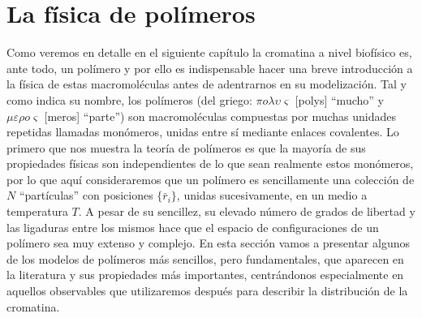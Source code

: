 \section{La física de polímeros}

Como veremos en detalle en el siguiente capítulo la cromatina a nivel biofísico es, ante todo, un polímero y por ello es indispensable hacer una breve introducción a la física de estas macromoléculas antes de adentrarnos en su modelización. Tal y como indica su nombre, los polímeros (del griego: $\pi o \lambda \upsilon \varsigma$ [polys] ``mucho'' y $\mu \varepsilon \rho o \varsigma$ [meros] ``parte'') son macromoléculas compuestas por muchas unidades repetidas llamadas monómeros, unidas entre sí mediante enlaces covalentes. Lo primero que nos muestra la teoría de polímeros es que la mayoría de sus propiedades físicas son independientes de lo que sean realmente estos monómeros, por lo que aquí consideraremos que un polímero es sencillamente una colección de $N$ ``partículas'' con posiciones $\{\bar{r}_i\}$, unidas sucesivamente, en un medio a temperatura $T$. A pesar de su sencillez, su elevado número de grados de libertad y las ligaduras entre los mismos hace que el espacio de configuraciones de un polímero sea muy extenso y complejo. En esta sección vamos a presentar algunos de los modelos de polímeros más sencillos, pero fundamentales, que aparecen en la literatura y sus propiedades más importantes, centrándonos especialmente en aquellos observables que utilizaremos después para describir la distribución de la cromatina.

